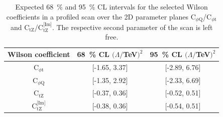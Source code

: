 \documentclass[letterpaper,11pt]{article}
\def\ctZ{C$_\text{tZ}$\xspace}
\def\ctZI{C$_\text{tZ}^\text{[Im]}$\xspace}
\def\cpt{C$_{\phi \text{t}}$\xspace}
\def\cpQM{C$_{\phi \text{Q}}$\xspace}
\begin{document}
\begin{table}[h]
\caption{Expected 68~\% and 95~\% CL intervals for the selected Wilson coefficients in a profiled scan over the 2D parameter planes \cpQM/\cpt and \ctZ/\ctZI. The respective second parameter of the scan is left free.}\label{tab:proflimits}
\begin{center}
\begin{tabular}{c|c|c}
\hline
Wilson coefficient & 68~\% CL $(\Lambda/$TeV$)^2$ & 95~\% CL $(\Lambda/$TeV$)^2$ \\
\hline
\hline
\cpt   & [-1.65, 3.37]                 & [-2.89, 6.76]                 \\
\hline
\cpQM  & [-1.35, 2.92]                 & [-2.33, 6.69]                 \\
\hline
\ctZ   & [-0.37, 0.36]                 & [-0.52, 0.51]                 \\
\hline
\ctZI  & [-0.38, 0.36]                 & [-0.54, 0.51]                 \\
\hline
\end{tabular}
\end{center}
\end{table}
\end{document}
